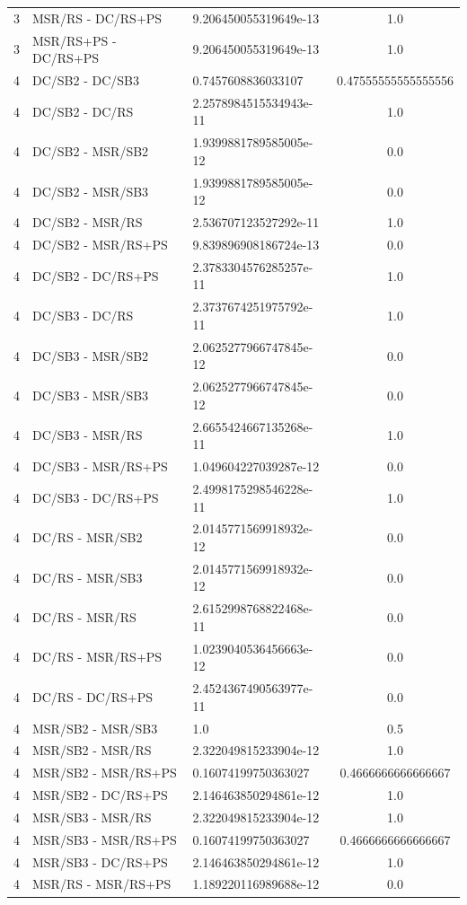 \documentclass[10pt,a4paper]{article}
\begin{document}
\begin{longtable}{c l l c}
3 & MSR/RS - DC/RS+PS & 9.206450055319649e-13 & 1.0 \\
3 & MSR/RS+PS - DC/RS+PS & 9.206450055319649e-13 & 1.0 \\
\midrule
4 & DC/SB2 - DC/SB3 & 0.7457608836033107 & 0.47555555555555556 \\
4 & DC/SB2 - DC/RS & 2.2578984515534943e-11 & 1.0 \\
4 & DC/SB2 - MSR/SB2 & 1.9399881789585005e-12 & 0.0 \\
4 & DC/SB2 - MSR/SB3 & 1.9399881789585005e-12 & 0.0 \\
4 & DC/SB2 - MSR/RS & 2.536707123527292e-11 & 1.0 \\
4 & DC/SB2 - MSR/RS+PS & 9.839896908186724e-13 & 0.0 \\
4 & DC/SB2 - DC/RS+PS & 2.3783304576285257e-11 & 1.0 \\
4 & DC/SB3 - DC/RS & 2.3737674251975792e-11 & 1.0 \\
4 & DC/SB3 - MSR/SB2 & 2.0625277966747845e-12 & 0.0 \\
4 & DC/SB3 - MSR/SB3 & 2.0625277966747845e-12 & 0.0 \\
4 & DC/SB3 - MSR/RS & 2.6655424667135268e-11 & 1.0 \\
4 & DC/SB3 - MSR/RS+PS & 1.049604227039287e-12 & 0.0 \\
4 & DC/SB3 - DC/RS+PS & 2.4998175298546228e-11 & 1.0 \\
4 & DC/RS - MSR/SB2 & 2.0145771569918932e-12 & 0.0 \\
4 & DC/RS - MSR/SB3 & 2.0145771569918932e-12 & 0.0 \\
4 & DC/RS - MSR/RS & 2.6152998768822468e-11 & 0.0 \\
4 & DC/RS - MSR/RS+PS & 1.0239040536456663e-12 & 0.0 \\
4 & DC/RS - DC/RS+PS & 2.4524367490563977e-11 & 0.0 \\
4 & MSR/SB2 - MSR/SB3 & 1.0 & 0.5 \\
4 & MSR/SB2 - MSR/RS & 2.322049815233904e-12 & 1.0 \\
4 & MSR/SB2 - MSR/RS+PS & 0.16074199750363027 & 0.4666666666666667 \\
4 & MSR/SB2 - DC/RS+PS & 2.146463850294861e-12 & 1.0 \\
4 & MSR/SB3 - MSR/RS & 2.322049815233904e-12 & 1.0 \\
4 & MSR/SB3 - MSR/RS+PS & 0.16074199750363027 & 0.4666666666666667 \\
4 & MSR/SB3 - DC/RS+PS & 2.146463850294861e-12 & 1.0 \\
4 & MSR/RS - MSR/RS+PS & 1.189220116989688e-12 & 0.0 \\

\end{longtable}
\end{document}
